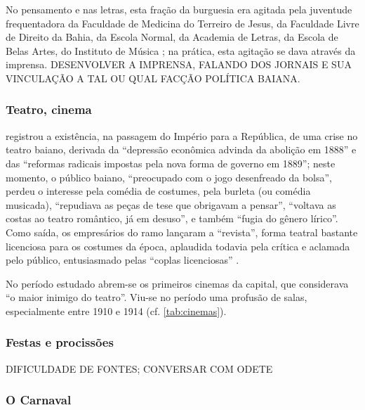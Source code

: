 No pensamento e nas letras, esta fração da burguesia era agitada pela juventude frequentadora da Faculdade de Medicina do Terreiro de Jesus, da Faculdade Livre de Direito da Bahia, da Escola Normal, da Academia de Letras, da Escola de Belas Artes, do Instituto de Música \cite[p.~272]{machadoneto_bahiaint_1972}; na prática, esta agitação se dava através da imprensa. DESENVOLVER A IMPRENSA, FALANDO DOS JORNAIS E SUA VINCULAÇÃO A TAL OU QUAL FACÇÃO POLÍTICA BAIANA.

\subsubsection{Teatro, cinema}\label{subsubsec:teacinbasa}

 registrou a existência, na passagem do Império para a República, de uma crise no teatro baiano, derivada da ``depressão econômica advinda da abolição em 1888'' e das ``reformas radicais impostas pela nova forma de governo em 1889''; neste momento, o público baiano, ``preocupado com o jogo desenfreado da bolsa'', perdeu o interesse pela comédia de costumes, pela burleta (ou comédia musicada), ``repudiava as peças de tese que obrigavam a pensar'', ``voltava as costas ao teatro romântico, já em desuso'', e também ``fugia do gênero lírico''. Como saída, os empresários do ramo lançaram a ``revista'', forma teatral bastante licenciosa para os costumes da época, aplaudida todavia pela crítica e aclamada pelo público, entusiasmado pelas ``coplas licenciosas'' \cite[p.~48-49]{ruy_teatro_1959}.

No período estudado abrem-se os primeiros cinemas da capital, que  considerava ``o maior inimigo do teatro''. Viu-se no período uma profusão de salas, especialmente entre 1910 e 1914 (cf. \autoref{tab:cinemas}).



\subsubsection{Festas e procissões}\label{subsubsec:fesprobasa}

DIFICULDADE DE FONTES; CONVERSAR COM ODETE

\subsubsection{O Carnaval}\label{subsubsec:carnabasa}

